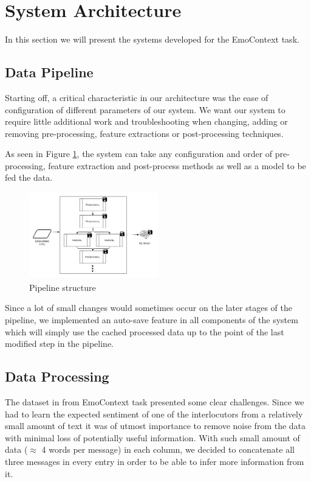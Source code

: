 \documentclass[11pt,a4paper]{article}
\begin{document}
\section{System Architecture}

In this section we will present the systems developed for the EmoContext task.

\subsection{Data Pipeline}

Starting off, a critical characteristic in our architecture was the ease of configuration of different parameters of our system. We want our system to require little additional work and troubleshooting when changing, adding or removing pre-processing, feature extractions or post-processing techniques.

As seen in Figure \ref{fig:pipeline1}, the system can take any configuration and order of pre-processing, feature extraction and post-process methods as well as a model to be fed the data.

\begin{figure}[h]
    \centering
    \includegraphics[width=0.5\textwidth]{images/pipeline_figure.PNG}
    \caption{Pipeline structure}
    \label{fig:pipeline1}
\end{figure}

Since a lot of small changes would sometimes occur on the later stages of the pipeline, we implemented an auto-save feature in all components of the system which will simply use the cached processed data up to the point of the last modified step in the pipeline.

\subsection{Data Processing}

The dataset in from EmoContext task presented some clear challenges. Since we had to learn the expected sentiment of one of the interlocutors from a relatively small amount of text it was of utmost importance to remove noise from the data with minimal loss of potentially useful information. With such small amount of data ($\approx$ 4 words per message) in each column, we decided to concatenate all three messages in every entry in order to be able to infer more information from it.
\end{document}
